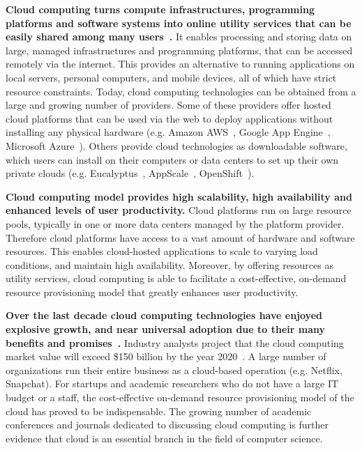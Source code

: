 \textbf{Cloud computing turns compute infrastructures, programming platforms and software systems
into online utility services that can be easily shared among many users~\cite{hassan2011demystifying,Mell:2011:SND:2206223}.}
It enables processing and storing data on large, managed infrastructures and 
programming platforms, that can be accessed remotely via the internet. This provides an
alternative to running applications on local servers, personal computers, and mobile devices,
all of which have strict resource constraints. 
Today, cloud computing technologies can be obtained from a large and growing number of providers.
Some of these providers offer hosted cloud platforms that can be used
via the web to deploy applications without installing any physical hardware 
(e.g. Amazon AWS~\cite{amazon-aws-web}, Google App Engine~\cite{gae}, Microsoft Azure~\cite{azure-web}). Others
provide cloud technologies as downloadable software, which users can install
on their computers or data centers to set up their own private clouds 
(e.g. Eucalyptus~\cite{eucalyptus09}, AppScale~\cite{6488671}, OpenShift~\cite{openshift}).

\textbf{Cloud computing model provides high scalability, high availability and enhanced levels of 
user productivity.} Cloud platforms run on large resource pools, typically in one or more
data centers managed by the platform provider. Therefore cloud platforms have access to a vast
amount of hardware and software resources. This enables cloud-hosted applications
to scale to varying load conditions, and maintain high availability. Moreover, by offering resources
as utility services, cloud computing is able to facilitate a cost-effective, on-demand
resource provisioning model that greatly enhances user productivity. 

\textbf{Over the last decade cloud computing technologies have enjoyed explosive growth, 
and near universal adoption due to their many benefits and 
promises~\cite{Antonopoulos:2010:CCP:1855007,Pinheiro:2014:ACC:2618168.2618188}.} 
Industry analysts project that the cloud computing market value will exceed \$150 billion
by the year 2020~\cite{cloud-growth}.
A large number of organizations
run their entire business as a cloud-based operation (e.g. Netflix, Snapchat). For startups
and academic researchers who do not have a large IT budget or a staff, the cost-effective 
on-demand resource provisioning model of the cloud has proved to be indispensable.
The growing number of academic conferences and journals dedicated to discussing
cloud computing is further evidence that cloud is an essential branch in the field
of computer science.

